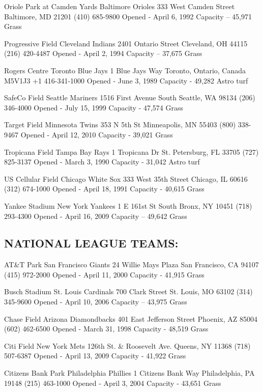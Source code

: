 Oriole Park at Camden Yards Baltimore Orioles 333 West Camden Street Baltimore, MD 21201 (410) 685-\/9800 Opened -\/ April 6, 1992 Capacity – 45,971 Grass

Progressive Field Cleveland Indians 2401 Ontario Street Cleveland, OH 44115 (216) 420-\/4487 Opened -\/ April 2, 1994 Capacity – 37,675 Grass

Rogers Centre Toronto Blue Jays 1 Blue Jays Way Toronto, Ontario, Canada M5\+V1\+J3 +1 416-\/341-\/1000 Opened -\/ June 3, 1989 Capacity -\/ 49,282 Astro turf

Safe\+Co Field Seattle Mariners 1516 First Avenue South Seattle, WA 98134 (206) 346-\/4000 Opened -\/ July 15, 1999 Capacity -\/ 47,574 Grass

Target Field Minnesota Twins 353 N 5th St Minneapolis, MN 55403 (800) 338-\/9467 Opened -\/ April 12, 2010 Capacity -\/ 39,021 Grass

Tropicana Field Tampa Bay Rays 1 Tropicana Dr St. Petersburg, FL 33705 (727) 825-\/3137 Opened -\/ March 3, 1990 Capacity -\/ 31,042 Astro turf

US Cellular Field Chicago White Sox 333 West 35th Street Chicago, IL 60616 (312) 674-\/1000 Opened -\/ April 18, 1991 Capacity -\/ 40,615 Grass

Yankee Stadium New York Yankees 1 E 161st St South Bronx, NY 10451 (718) 293-\/4300 Opened -\/ April 16, 2009 Capacity – 49,642 Grass

\subsection*{N\+A\+T\+I\+O\+N\+AL L\+E\+A\+G\+UE T\+E\+A\+MS\+: }

AT\&T Park San Francisco Giants 24 Willie Mays Plaza San Francisco, CA 94107 (415) 972-\/2000 Opened -\/ April 11, 2000 Capacity -\/ 41,915 Grass

Busch Stadium St. Louis Cardinals 700 Clark Street St. Louis, MO 63102 (314) 345-\/9600 Opened -\/ April 10, 2006 Capacity – 43,975 Grass

Chase Field Arizona Diamondbacks 401 East Jefferson Street Phoenix, AZ 85004 (602) 462-\/6500 Opened -\/ March 31, 1998 Capacity -\/ 48,519 Grass

Citi Field New York Mets 126th St. \& Roosevelt Ave. Queens, NY 11368 (718) 507-\/6387 Opened -\/ April 13, 2009 Capacity -\/ 41,922 Grass

Citizens Bank Park Philadelphia Phillies 1 Citizens Bank Way Philadelphia, PA 19148 (215) 463-\/1000 Opened -\/ April 3, 2004 Capacity -\/ 43,651 Grass

